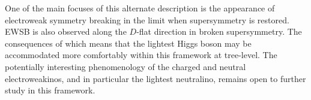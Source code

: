 One of the main focuses of this alternate description is the appearance of electroweak symmetry breaking in the limit when supersymmetry is restored. EWSB is also observed along the $D$-flat direction in broken supersymmetry. The consequences of which means that the lightest Higgs boson may be accommodated more comfortably within this framework at tree-level. The potentially interesting phenomenology of the charged and neutral electroweakinos, and in particular the lightest neutralino, remains open to further study in this framework.





